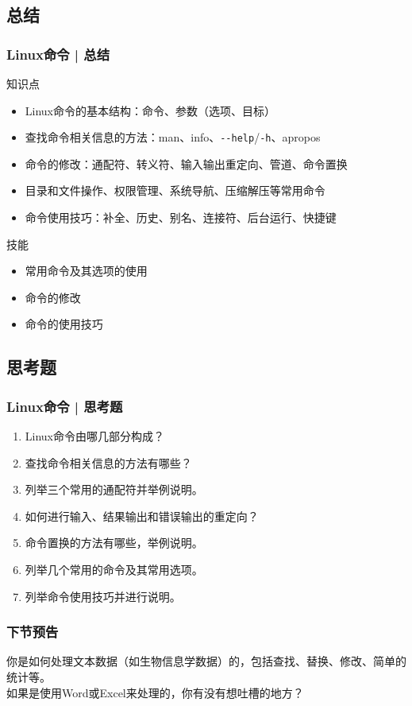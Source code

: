 \subsection{总结}
\begin{frame}[fragile]
  \frametitle{Linux命令 | 总结}
  \begin{block}{知识点}
    \begin{itemize}
      \item Linux命令的基本结构：命令、参数（选项、目标）
      \item 查找命令相关信息的方法：man、info、\verb|--help|/\verb|-h|、apropos
      \item 命令的修改：通配符、转义符、输入输出重定向、管道、命令置换
      \item 目录和文件操作、权限管理、系统导航、压缩解压等常用命令
      \item 命令使用技巧：补全、历史、别名、连接符、后台运行、快捷键
    \end{itemize}
  \end{block}
  \begin{block}{技能}
    \begin{itemize}
      \item 常用命令及其选项的使用
      \item 命令的修改
      \item 命令的使用技巧
    \end{itemize}
  \end{block}
\end{frame}

\subsection{思考题}
\begin{frame}
  \frametitle{Linux命令 | 思考题}
  \begin{enumerate}
    \item Linux命令由哪几部分构成？
    \item 查找命令相关信息的方法有哪些？
    \item 列举三个常用的通配符并举例说明。
    \item 如何进行输入、结果输出和错误输出的重定向？
    \item 命令置换的方法有哪些，举例说明。
    \item 列举几个常用的命令及其常用选项。
    \item 列举命令使用技巧并进行说明。
  \end{enumerate}
\end{frame}

\begin{frame}
  \frametitle{下节预告}
  你是如何处理文本数据（如生物信息学数据）的，包括查找、替换、修改、简单的统计等。\\
  如果是使用Word或Excel来处理的，你有没有想吐槽的地方？
\end{frame}





